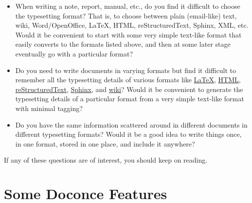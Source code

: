 \documentclass[%
oneside,                 %
final,                   %
10pt]{article}
\begin{document}
\begin{itemize}
 \item When writing a note, report, manual, etc., do you find it difficult
   to choose the typesetting format? That is, to choose between plain
   (email-like) text, wiki, Word/OpenOffice, {\LaTeX}, HTML,
   reStructuredText, Sphinx, XML, etc.  Would it be convenient to
   start with some very simple text-like format that easily converts
   to the formats listed above, and then at some later stage
   eventually go with a particular format?

 \item Do you need to write documents in varying formats but find it
   difficult to remember all the typesetting details of various
   formats like \href{{http://refcards.com/docs/silvermanj/amslatex/LaTeXRefCard.v2.0.pdf}}{LaTeX}, \href{{http://www.htmlcodetutorial.com/}}{HTML}, \href{{http://docutils.sourceforge.net/docs/ref/rst/restructuredtext.html}}{reStructuredText}, \href{{http://sphinx.pocoo.org/contents.html}}{Sphinx}, and \href{{http://code.google.com/p/support/wiki/WikiSyntax}}{wiki}? Would it be convenient
   to generate the typesetting details of a particular format from a
   very simple text-like format with minimal tagging?

 \item Do you have the same information scattered around in different
   documents in different typesetting formats? Would it be a good idea
   to write things once, in one format, stored in one place, and
   include it anywhere?
\end{itemize}

\noindent
If any of these questions are of interest, you should keep on reading.


\section{Some Doconce Features}
\end{document}
